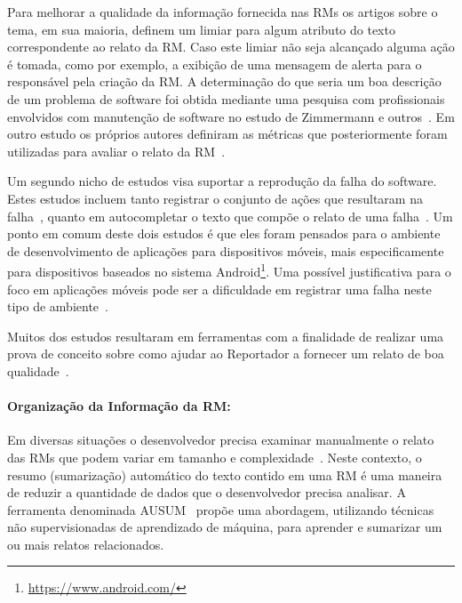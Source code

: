 Para melhorar a qualidade da informação fornecida nas RMs os artigos sobre o
tema, em sua maioria, definem um limiar para algum atributo do texto
correspondente ao relato da RM\@. Caso este limiar não seja alcançado alguma
ação é tomada, como por exemplo, a exibição de uma mensagem de alerta para o
responsável pela criação da RM\@. A determinação do que seria um boa descrição
de um problema de software foi obtida mediante uma pesquisa com profissionais
envolvidos com manutenção de software no estudo de Zimmermann e
outros~\cite{zimmermann2010makes}. Em outro estudo os próprios autores
definiram as métricas que posteriormente foram utilizadas para avaliar o relato
da RM~\cite{Tu:2014:MQI:2677832.2677844}.

Um segundo nicho de estudos visa suportar a reprodução da falha do software.
Estes estudos incluem tanto registrar o conjunto de ações que resultaram na
falha~\cite{White:2015:GRR:2820282.2820291}, quanto em autocompletar o texto que
compõe o relato de uma falha~\cite{moran2015auto}. Um ponto em comum deste dois
estudos é que eles foram pensados para o ambiente de desenvolvimento de
aplicações para dispositivos móveis, mais especificamente para dispositivos
baseados no sistema Android\footnote{\url{https://www.android.com/}}. Uma
possível justificativa para o foco em aplicações móveis pode ser a dificuldade
em registrar uma falha neste tipo de
ambiente~\cite{White:2015:GRR:2820282.2820291, moran2015auto}.

Muitos dos estudos resultaram em ferramentas com a finalidade de realizar uma
prova de conceito sobre como ajudar ao Reportador a fornecer um relato de boa
qualidade~\cite{Tu:2014:MQI:2677832.2677844, zimmermann2010makes,
    Wu2011a,White:2015:GRR:2820282.2820291,moran2015auto}.

\paragraph{Organização da Informação da RM:}

Em diversas situações o desenvolvedor precisa examinar manualmente o relato das
RMs que podem variar em tamanho e complexidade~\cite{mani2012ausum}. Neste
contexto, o resumo (sumarização) automático do texto contido em uma RM é uma
maneira de reduzir a quantidade de dados que o desenvolvedor precisa analisar.
A ferramenta denominada AUSUM~\cite{mani2012ausum} propõe uma abordagem,
utilizando técnicas não supervisionadas de aprendizado de máquina, para aprender
e sumarizar um ou mais relatos relacionados.

